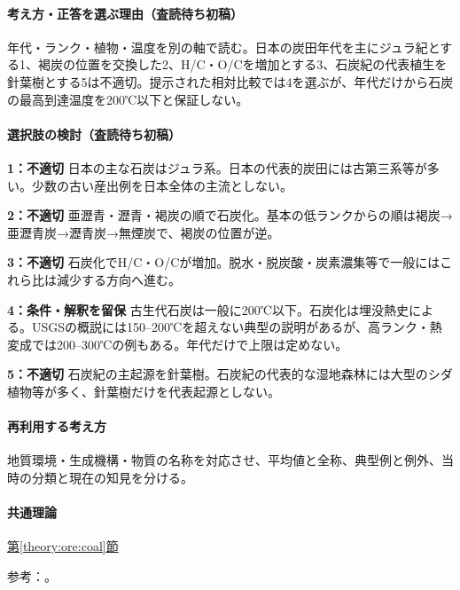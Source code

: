 \paragraph{考え方・正答を選ぶ理由（査読待ち初稿）} 年代・ランク・植物・温度を別の軸で読む。日本の炭田年代を主にジュラ紀とする1、褐炭の位置を交換した2、H/C・O/Cを増加とする3、石炭紀の代表植生を針葉樹とする5は不適切。提示された相対比較では4を選ぶが、年代だけから石炭の最高到達温度を200℃以下と保証しない。

\paragraph{選択肢の検討（査読待ち初稿）}\mbox{}\par

\noindent\textbf{1：不適切} 日本の主な石炭はジュラ系。日本の代表的炭田には古第三系等が多い。少数の古い産出例を日本全体の主流としない。\par

\noindent\textbf{2：不適切} 亜瀝青・瀝青・褐炭の順で石炭化。基本の低ランクからの順は褐炭→亜瀝青炭→瀝青炭→無煙炭で、褐炭の位置が逆。\par

\noindent\textbf{3：不適切} 石炭化でH/C・O/Cが増加。脱水・脱炭酸・炭素濃集等で一般にはこれら比は減少する方向へ進む。\par

\noindent\textbf{4：条件・解釈を留保} 古生代石炭は一般に200℃以下。石炭化は埋没熱史による。USGSの概説には150–200℃を超えない典型の説明があるが、高ランク・熱変成では200–300℃の例もある。年代だけで上限は定めない。\par

\noindent\textbf{5：不適切} 石炭紀の主起源を針葉樹。石炭紀の代表的な湿地森林には大型のシダ植物等が多く、針葉樹だけを代表起源としない。\par

\paragraph{再利用する考え方} 地質環境・生成機構・物質の名称を対応させ、平均値と全称、典型例と例外、当時の分類と現在の知見を分ける。

\paragraph{共通理論} \hyperref[theory:ore:coal]{第\ref*{theory:ore:coal}節}

\par 参考：\cite{ore50_coal_ref,ore50_coal_temp_ref,ore50_japan_coal_ref}。

